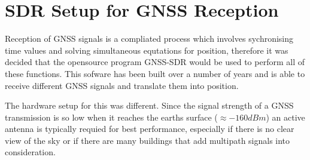 \section{SDR Setup for GNSS Reception}
Reception of GNSS signals is a compliated process which involves sychronising time values and solving simultaneous equtations for position, therefore it was decided that
the opensource program GNSS-SDR would be used to perform all of these functions. This sofware has been built over a number of years and is able to receive different GNSS
signals and translate them into position.

The hardware setup for this was different. Since the signal strength of a GNSS transmission is so low when it reaches the earths surface ($\approx -160dBm$) an active
antenna is typically requied for best performance, especially if there is no clear view of the sky or if there are many buildings that add multipath signals into
consideration.
